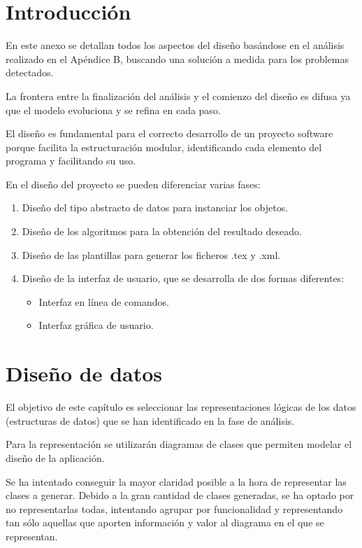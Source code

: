 
\section{Introducción}
En este anexo se detallan todos los aspectos del diseño basándose en el análisis realizado en el
Apéndice B, buscando una solución a medida para los problemas detectados.

La frontera entre la finalización del análisis y el comienzo del diseño es difusa ya que el modelo evoluciona y se refina en cada paso.

El diseño es fundamental para el correcto desarrollo de un proyecto software porque facilita la estructuración modular, identificando cada elemento del programa y facilitando su uso.

En el diseño del proyecto se pueden diferenciar varias fases:
\begin{enumerate}
\item Diseño del tipo abstracto de datos para instanciar los objetos.
\item Diseño de los algoritmos para la obtención del resultado deseado.
\item Diseño de las plantillas para generar los ficheros .tex y .xml.
\item Diseño de la interfaz de usuario, que se desarrolla de dos formas diferentes:
\begin{itemize}
\item Interfaz en línea de comandos.
\item Interfaz gráfica de usuario.
\end{itemize}
\end{enumerate}

\section{Diseño de datos}
El objetivo de este capítulo es seleccionar las representaciones lógicas de los datos (estructuras
de datos) que se han identificado en la fase de análisis.

Para la representación se utilizarán diagramas de clases que permiten modelar el diseño de la aplicación.

Se ha intentado conseguir la mayor claridad posible a la hora de representar las clases a generar. Debido a la gran cantidad de clases generadas, se ha optado por no representarlas todas, intentando agrupar por funcionalidad y representando tan sólo aquellas que aporten información y valor al diagrama en el que se representan.

